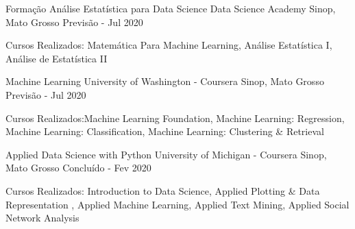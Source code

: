 \documentclass[11pt, letter]{awesome-cv}
\begin{document}
\vspace{-3mm}
\vspace{-2mm}
\begin{cventries}
	\cventry
	{Formação Análise Estatística para Data Science}
	{\vspace{3mm}Data Science Academy\vspace{-5mm}}
	{\vspace{3mm}Sinop, Mato Grosso\vspace{-5mm}}
	{Previsão - Jul 2020}
	{
		\begin{cvitems}
			\vspace{-2mm}
			\item {Cursos Realizados: Matemática Para Machine Learning, Análise Estatística I, Análise de Estatística II\vspace{-2mm}}
		\end{cvitems}
	}
	\cventry
	{Machine Learning}
	{\vspace{3mm}University of Washington - Coursera\vspace{-5mm}}
	{\vspace{3mm}Sinop, Mato Grosso\vspace{-5mm}}
	{Previsão - Jul 2020}
	{
		\begin{cvitems}
			\vspace{-1mm}
			\item {Cursos Realizados:Machine Learning Foundation, Machine Learning: Regression, Machine Learning: Classification, Machine Learning: Clustering \& Retrieval\vspace{-2mm}}
		\end{cvitems}
	}
	\cventry
	{Applied Data Science with Python}
	{\vspace{3mm}University of Michigan - Coursera\vspace{-5mm}}
	{\vspace{3mm}Sinop, Mato Grosso\vspace{-5mm}}
	{Concluído - Fev 2020}
	{
		\begin{cvitems}
			\vspace{-1mm}
			\item {Cursos Realizados: Introduction to Data Science, Applied Plotting \& Data Representation , Applied Machine Learning, Applied Text Mining, Applied Social Network Analysis\vspace{-2mm}}
		\end{cvitems}
	}
\end{cventries}
\end{document}
